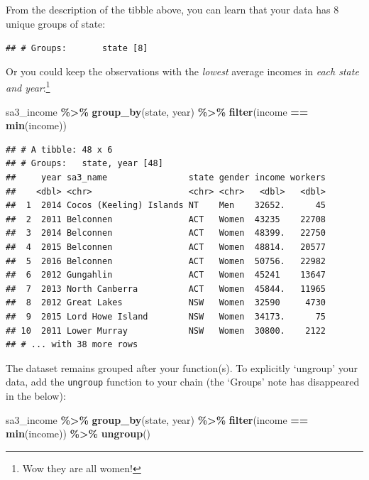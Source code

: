 \documentclass[
]{book}
\newenvironment{Shaded}{\begin{snugshade}}{\end{snugshade}}
\newcommand{\KeywordTok}[1]{\textcolor[rgb]{0.13,0.29,0.53}{\textbf{#1}}}
\newcommand{\NormalTok}[1]{#1}
\newcommand{\OperatorTok}[1]{\textcolor[rgb]{0.81,0.36,0.00}{\textbf{#1}}}
\newcommand{\StringTok}[1]{\textcolor[rgb]{0.31,0.60,0.02}{#1}}
\begin{document}
From the description of the tibble above, you can learn that your data has 8 unique groups of state:

\texttt{\#\#\ \#\ Groups:\ \ \ \ \ \ \ state\ {[}8{]}}

Or you could keep the observations with the \emph{lowest} average incomes in \emph{each state and year}:\footnote{Wow they are all women!}

\begin{Shaded}
\begin{Highlighting}[]
\NormalTok{sa3\_income }\OperatorTok{\%\textgreater{}\%}\StringTok{ }
\StringTok{  }\KeywordTok{group\_by}\NormalTok{(state, year) }\OperatorTok{\%\textgreater{}\%}\StringTok{ }
\StringTok{  }\KeywordTok{filter}\NormalTok{(income }\OperatorTok{==}\StringTok{ }\KeywordTok{min}\NormalTok{(income))}
\end{Highlighting}
\end{Shaded}

\begin{verbatim}
## # A tibble: 48 x 6
## # Groups:   state, year [48]
##     year sa3_name                state gender income workers
##    <dbl> <chr>                   <chr> <chr>   <dbl>   <dbl>
##  1  2014 Cocos (Keeling) Islands NT    Men    32652.      45
##  2  2011 Belconnen               ACT   Women  43235    22708
##  3  2014 Belconnen               ACT   Women  48399.   22750
##  4  2015 Belconnen               ACT   Women  48814.   20577
##  5  2016 Belconnen               ACT   Women  50756.   22982
##  6  2012 Gungahlin               ACT   Women  45241    13647
##  7  2013 North Canberra          ACT   Women  45844.   11965
##  8  2012 Great Lakes             NSW   Women  32590     4730
##  9  2015 Lord Howe Island        NSW   Women  34173.      75
## 10  2011 Lower Murray            NSW   Women  30800.    2122
## # ... with 38 more rows
\end{verbatim}

The dataset remains grouped after your function(s). To explicitly `ungroup' your data, add the \texttt{ungroup} function to your chain (the `Groups' note has disappeared in the below):

\begin{Shaded}
\begin{Highlighting}[]
\NormalTok{sa3\_income }\OperatorTok{\%\textgreater{}\%}\StringTok{ }
\StringTok{  }\KeywordTok{group\_by}\NormalTok{(state, year) }\OperatorTok{\%\textgreater{}\%}\StringTok{ }
\StringTok{  }\KeywordTok{filter}\NormalTok{(income }\OperatorTok{==}\StringTok{ }\KeywordTok{min}\NormalTok{(income)) }\OperatorTok{\%\textgreater{}\%}\StringTok{ }
\StringTok{  }\KeywordTok{ungroup}\NormalTok{()}
\end{Highlighting}
\end{Shaded}
\end{document}
